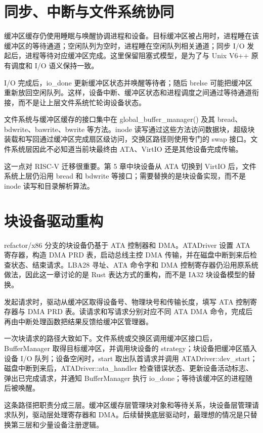 \section{同步、中断与文件系统协同}

缓冲区缓存仍使用睡眠与唤醒协调进程和设备。目标缓冲区被占用时，进程睡在该缓冲区的等待通道；空闲队列为空时，进程睡在空闲队列相关通道；同步 I/O 发起后，进程等待对应缓冲区完成。这里保留阻塞式模型，是为了与 Unix V6++ 原有调度和 I/O 语义保持一致。

I/O 完成后，io\_done 更新缓冲区状态并唤醒等待者；随后 brelse 可能把缓冲区重新放回空闲队列。这样，设备中断、缓冲区状态和进程调度之间通过等待通道衔接，而不是让上层文件系统忙轮询设备状态。

文件系统与缓冲区缓存的接口集中在 global\_buffer\_manager() 及其 bread、bdwrite、bawrite、bwrite 等方法。inode 读写通过这些方法访问数据块，超级块装载和写回通过缓冲区完成扇区级访问，交换区路径则使用专门的 swap 接口。文件系统层因此不必知道当前块最终由 ATA、VirtIO 还是其他设备完成传输。

这一点对 RISC-V 迁移很重要。第 5 章中块设备从 ATA 切换到 VirtIO 后，文件系统上层仍沿用 bread 和 bdwrite 等接口；需要替换的是块设备实现，而不是 inode 读写和目录解析算法。

\section{块设备驱动重构}

refactor/x86 分支的块设备仍基于 ATA 控制器和 DMA。ATADriver 设置 ATA 寄存器，构造 DMA PRD 表，启动总线主控 DMA 传输，并在磁盘中断到来后检查状态、结束请求。LBA28 寻址、ATA 命令字和 DMA 控制寄存器仍沿用原系统做法，因此这一章讨论的是 Rust 表达方式的重构，而不是 IA32 块设备模型的替换。

发起请求时，驱动从缓冲区取得设备号、物理块号和传输长度，填写 ATA 控制寄存器与 DMA PRD 表。读请求和写请求分别对应不同 ATA DMA 命令，完成后再由中断处理函数把结果反馈给缓冲区管理器。

一次块请求的路径大致如下。文件系统或交换区调用缓冲区接口后，BufferManager 取得目标缓冲区，并调用块设备的 strategy；块设备把缓冲区插入设备 I/O 队列；设备空闲时，start 取出队首请求并调用 ATADriver::dev\_start；磁盘中断到来后，ATADriver::ata\_handler 检查错误状态、更新设备活动标志、弹出已完成请求，并通知 BufferManager 执行 io\_done；等待该缓冲区的进程随后被唤醒。

这条路径把职责分成三层。缓冲区缓存层管理块对象和等待关系，块设备层管理请求队列，驱动层处理寄存器和 DMA。后续替换底层驱动时，最理想的情况是只替换第三层和少量设备注册逻辑。

